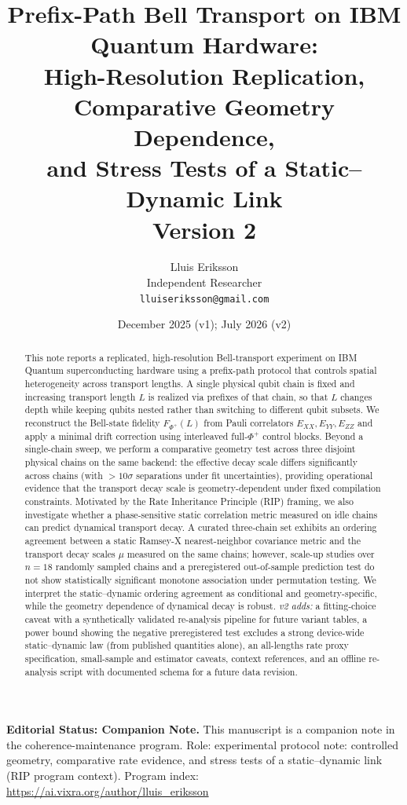 \documentclass[11pt]{article}
\title{Prefix-Path Bell Transport on IBM Quantum Hardware:\\
High-Resolution Replication, Comparative Geometry Dependence,\\
and Stress Tests of a Static--Dynamic Link\\
{\normalsize Version 2}}
\author{Lluis Eriksson\\ Independent Researcher\\ \texttt{lluiseriksson@gmail.com}}
\date{December 2025 (v1); July 2026 (v2)}
\begin{document}
\maketitle

\noindent\textbf{Editorial Status: Companion Note.}
This manuscript is a companion note in the coherence-maintenance program.
Role: experimental protocol note: controlled geometry, comparative rate
evidence, and stress tests of a static--dynamic link (RIP program context).
Program index: \url{https://ai.vixra.org/author/lluis_eriksson}

\begin{abstract}
This note reports a replicated, high-resolution Bell-transport experiment on
IBM Quantum superconducting hardware using a prefix-path protocol that
controls spatial heterogeneity across transport lengths. A single physical
qubit chain is fixed and increasing transport length $L$ is realized via
prefixes of that chain, so that $L$ changes depth while keeping qubits nested
rather than switching to different qubit subsets. We reconstruct the
Bell-state fidelity $F_{\Phi^+}(L)$ from Pauli correlators $E_{XX}, E_{YY},
E_{ZZ}$ and apply a minimal drift correction using interleaved full-$\Phi^+$
control blocks. Beyond a single-chain sweep, we perform a comparative
geometry test across three disjoint physical chains on the same backend: the
effective decay scale differs significantly across chains (with $>10\sigma$
separations under fit uncertainties), providing operational evidence that
the transport decay scale is geometry-dependent under fixed compilation
constraints. Motivated by the Rate Inheritance Principle (RIP) framing, we
also investigate whether a phase-sensitive static correlation metric measured
on idle chains can predict dynamical transport decay. A curated three-chain
set exhibits an ordering agreement between a static Ramsey-X nearest-neighbor
covariance metric and the transport decay scales $\mu$ measured on the same
chains; however, scale-up studies over $n=18$ randomly sampled chains and a
preregistered out-of-sample prediction test do not show statistically
significant monotone association under permutation testing. We interpret the
static--dynamic ordering agreement as conditional and geometry-specific,
while the geometry dependence of dynamical decay is robust. \emph{v2 adds:}
a fitting-choice caveat with a synthetically validated re-analysis pipeline
for future variant tables, a power bound showing the negative preregistered
test excludes a strong device-wide static--dynamic law (from published
quantities alone), an all-lengths rate proxy specification, small-sample and
estimator caveats, context references, and an offline re-analysis script
with documented schema for a future data revision.
\end{abstract}
\end{document}
